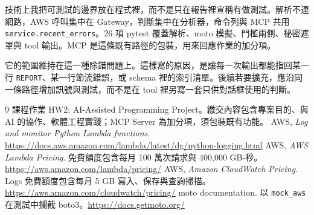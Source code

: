 \documentclass[11pt]{article}
\begin{document}
技術上我把可測試的邊界放在程式裡，而不是只在報告裡宣稱有做測試。解析不連網路，AWS 呼叫集中在 Gateway，判斷集中在分析器，命令列與 MCP 共用 \texttt{service.recent\_errors}。26 項 pytest 覆蓋解析、moto 模擬、門檻兩側、秘密遮罩與 tool 輸出。MCP 是這條既有路徑的包裝，用來回應作業的加分項。

它的範圍維持在這一種除錯問題上。這樣寫的原因，是讓每一次輸出都能指回某一行 \texttt{REPORT}、某一行節流錯誤，或 schema 裡的索引清單。後續若要擴充，應沿同一條路徑增加訊號與測試，而不是在 tool 裡另寫一套只供對話框使用的判斷。

\begin{thebibliography}{9}
課程作業 HW2: AI-Assisted Programming Project。繳交內容包含專案目的、與 AI 的協作、軟體工程實踐；MCP Server 為加分項，須包裝既有功能。
AWS, \emph{Log and monitor Python Lambda functions}. \url{https://docs.aws.amazon.com/lambda/latest/dg/python-logging.html}
AWS, \emph{AWS Lambda Pricing}. 免費額度包含每月 100 萬次請求與 400{,}000 GB-秒。\url{https://aws.amazon.com/lambda/pricing/}
AWS, \emph{Amazon CloudWatch Pricing}. Logs 免費額度包含每月 5 GB 寫入、保存與查詢掃描。\url{https://aws.amazon.com/cloudwatch/pricing/}
moto documentation. 以 \texttt{mock\_aws} 在測試中攔截 boto3。\url{https://docs.getmoto.org/}
\end{thebibliography}
\end{document}
